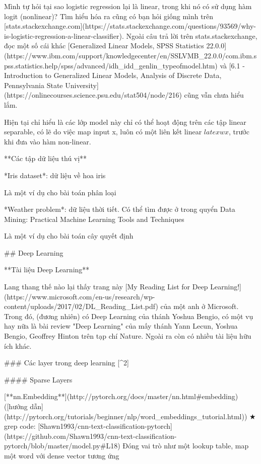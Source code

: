 Mình tự hỏi tại sao logistic regression lại là linear, trong khi nó có sử dụng hàm logit (nonlinear)? Tìm hiểu hóa ra cũng có bạn hỏi giống mình trên [stats.stackexchange.com](https://stats.stackexchange.com/questions/93569/why-is-logistic-regression-a-linear-classifier). Ngoài câu trả lời trên stats.stackexchange, đọc một số cái khác [Generalized Linear Models, SPSS Statistics 22.0.0](https://www.ibm.com/support/knowledgecenter/en/SSLVMB_22.0.0/com.ibm.spss.statistics.help/spss/advanced/idh_idd_genlin_typeofmodel.htm)
 và [6.1 - Introduction to Generalized Linear Models, Analysis of Discrete Data, Pennsylvania State University](https://onlinecourses.science.psu.edu/stat504/node/216) cũng vẫn chưa hiểu lắm.

Hiện tại chỉ hiểu là các lớp model này chỉ có thể hoạt động trên các tập linear separable, có lẽ do việc map input x, luôn có một liên kết linear $latex wx$, trước khi đưa vào hàm non-linear.

**Các tập dữ liệu thú vị**

*Iris dataset*: dữ liệu về hoa iris

Là một ví dụ cho bài toán phân loại

*Weather problem*: dữ liệu thời tiết. Có thể tìm được ở trong quyển Data Mining: Practical Machine Learning Tools and Techniques

Là một ví dụ cho bài toán cây quyết định

## Deep Learning

**Tài liệu Deep Learning**

Lang thang thế nào lại thấy trang này [My Reading List for Deep Learning!](https://www.microsoft.com/en-us/research/wp-content/uploads/2017/02/DL_Reading_List.pdf) của một anh ở Microsoft. Trong đó, (đương nhiên) có Deep Learning của thánh Yoshua Bengio, có một vụ hay nữa là bài review "Deep Learning" của mấy thánh Yann Lecun, Yoshua Bengio, Geoffrey Hinton trên tạp chí Nature. Ngoài ra còn có nhiều tài liệu hữu ích khác.

### Các layer trong deep learning [^2]

#### Sparse Layers

[**nn.Embedding**](http://pytorch.org/docs/master/nn.html#embedding) ([hướng dẫn](http://pytorch.org/tutorials/beginner/nlp/word_embeddings_tutorial.html))
★ grep code: [Shawn1993/cnn-text-classification-pytorch](https://github.com/Shawn1993/cnn-text-classification-pytorch/blob/master/model.py#L18)
Đóng vai trò như một lookup table, map một word với dense vector tương ứng

